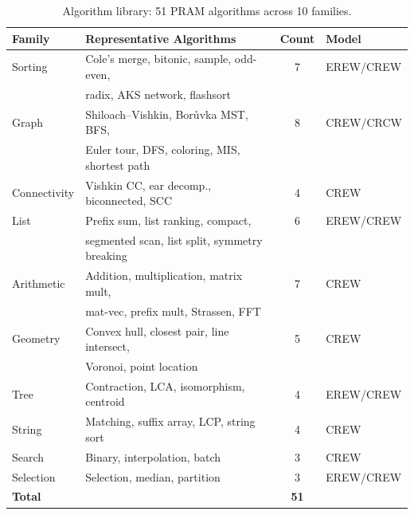 \documentclass[11pt]{article}
\begin{document}
\begin{table}[t]
\centering
\caption{Algorithm library: 51 PRAM algorithms across 10 families.}
\label{tab:algorithms}
\begin{tabular}{@{}llcl@{}}
\toprule
\textbf{Family} & \textbf{Representative Algorithms} & \textbf{Count} & \textbf{Model} \\
\midrule
Sorting & Cole's merge, bitonic, sample, odd-even, & 7 & EREW/CREW \\
  & radix, AKS network, flashsort & & \\
Graph & Shiloach--Vishkin, Bor\r{u}vka MST, BFS, & 8 & CREW/CRCW \\
  & Euler tour, DFS, coloring, MIS, shortest path & & \\
Connectivity & Vishkin CC, ear decomp., biconnected, SCC & 4 & CREW \\
List & Prefix sum, list ranking, compact, & 6 & EREW/CREW \\
  & segmented scan, list split, symmetry breaking & & \\
Arithmetic & Addition, multiplication, matrix mult, & 7 & CREW \\
  & mat-vec, prefix mult, Strassen, FFT & & \\
Geometry & Convex hull, closest pair, line intersect, & 5 & CREW \\
  & Voronoi, point location & & \\
Tree & Contraction, LCA, isomorphism, centroid & 4 & EREW/CREW \\
String & Matching, suffix array, LCP, string sort & 4 & CREW \\
Search & Binary, interpolation, batch & 3 & CREW \\
Selection & Selection, median, partition & 3 & EREW/CREW \\
\midrule
\textbf{Total} & & \textbf{51} & \\
\bottomrule
\end{tabular}
\end{table}
\end{document}
